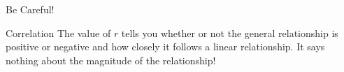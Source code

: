 \begin{frame}{Be Careful!}

  \begin{block}{Correlation}
    The value of $r$ tells you whether or not the general relationship
    is positive or negative and how closely it follows a linear
    relationship. It says nothing about the magnitude of the relationship!
  \end{block}
  
\end{frame}



